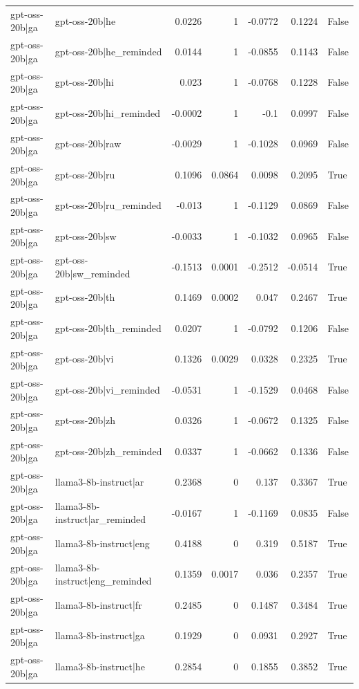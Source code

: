 \begin{table}
\begin{tabular}{l l r r r r l}
gpt-oss-20b|ga & gpt-oss-20b|he & 0.0226 & 1 & -0.0772 & 0.1224 & False \\
gpt-oss-20b|ga & gpt-oss-20b|he_reminded & 0.0144 & 1 & -0.0855 & 0.1143 & False \\
gpt-oss-20b|ga & gpt-oss-20b|hi & 0.023 & 1 & -0.0768 & 0.1228 & False \\
gpt-oss-20b|ga & gpt-oss-20b|hi_reminded & -0.0002 & 1 & -0.1 & 0.0997 & False \\
gpt-oss-20b|ga & gpt-oss-20b|raw & -0.0029 & 1 & -0.1028 & 0.0969 & False \\
gpt-oss-20b|ga & gpt-oss-20b|ru & 0.1096 & 0.0864 & 0.0098 & 0.2095 & True \\
gpt-oss-20b|ga & gpt-oss-20b|ru_reminded & -0.013 & 1 & -0.1129 & 0.0869 & False \\
gpt-oss-20b|ga & gpt-oss-20b|sw & -0.0033 & 1 & -0.1032 & 0.0965 & False \\
gpt-oss-20b|ga & gpt-oss-20b|sw_reminded & -0.1513 & 0.0001 & -0.2512 & -0.0514 & True \\
gpt-oss-20b|ga & gpt-oss-20b|th & 0.1469 & 0.0002 & 0.047 & 0.2467 & True \\
gpt-oss-20b|ga & gpt-oss-20b|th_reminded & 0.0207 & 1 & -0.0792 & 0.1206 & False \\
gpt-oss-20b|ga & gpt-oss-20b|vi & 0.1326 & 0.0029 & 0.0328 & 0.2325 & True \\
gpt-oss-20b|ga & gpt-oss-20b|vi_reminded & -0.0531 & 1 & -0.1529 & 0.0468 & False \\
gpt-oss-20b|ga & gpt-oss-20b|zh & 0.0326 & 1 & -0.0672 & 0.1325 & False \\
gpt-oss-20b|ga & gpt-oss-20b|zh_reminded & 0.0337 & 1 & -0.0662 & 0.1336 & False \\
gpt-oss-20b|ga & llama3-8b-instruct|ar & 0.2368 & 0 & 0.137 & 0.3367 & True \\
gpt-oss-20b|ga & llama3-8b-instruct|ar_reminded & -0.0167 & 1 & -0.1169 & 0.0835 & False \\
gpt-oss-20b|ga & llama3-8b-instruct|eng & 0.4188 & 0 & 0.319 & 0.5187 & True \\
gpt-oss-20b|ga & llama3-8b-instruct|eng_reminded & 0.1359 & 0.0017 & 0.036 & 0.2357 & True \\
gpt-oss-20b|ga & llama3-8b-instruct|fr & 0.2485 & 0 & 0.1487 & 0.3484 & True \\
gpt-oss-20b|ga & llama3-8b-instruct|ga & 0.1929 & 0 & 0.0931 & 0.2927 & True \\
gpt-oss-20b|ga & llama3-8b-instruct|he & 0.2854 & 0 & 0.1855 & 0.3852 & True \\

\end{tabular}
\end{table}

